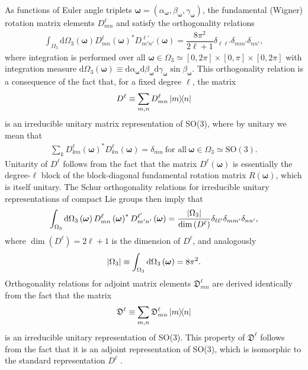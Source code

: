 \documentclass[notitlepage,twocolumn]{revtex4-2}
\renewcommand{\t}{\text} %
\newcommand{\f}[2]{\dfrac{#1}{#2}} %
\newcommand{\p}[1]{\left(#1\right)} %
\renewcommand{\v}{\bm} %
\newcommand{\1}{\mathds{1}}
\newcommand{\D}{\mathfrak{D}}
\renewcommand{\d}{\text{d}}
\newcommand{\SO}{\text{SO}}
\begin{document}
As functions of Euler angle triplets $\v\omega=\p{\alpha_{\v\omega},\beta_{\v\omega},\gamma_{\v\omega}}$, the fundamental (Wigner) rotation matrix elements $D_{mn}^\ell$ and satisfy the orthogonality relations \cite{brown2003rotational}
\begin{align}
  \int_{\Omega_3} \d\Omega_3\p{\v\omega}
  D^{\ell}_{mn}\p{\v\omega}^* D^{\ell'}_{m'n'}\p{\v\omega}
  = \f{8\pi^2}{2\ell+1} \delta_{\ell\ell'} \delta_{mm'} \delta_{nn'},
  \label{eq:orthogonal}
\end{align}
where integration is performed over all $\v\omega\in\Omega_3\simeq[0,2\pi]\times[0,\pi]\times[0,2\pi]$ with integration measure $\d\Omega_3\p{\v\omega}\equiv\d\alpha_{\v\omega} \d\beta_{\v\omega} \d\gamma_{\v\omega} \sin\beta_{\v\omega}$.
This orthogonality relation is a consequence of the fact that, for a fixed degree $\ell$, the matrix
\begin{align}
  D^\ell \equiv \sum_{m,n} D^\ell_{mn} \op{m}{n}
\end{align}
is an irreducible unitary matrix representation of SO(3), where by unitary we mean that
\begin{align}
  \sum_k D^\ell_{km}\p{\v\omega}^* D^\ell_{kn}\p{\v\omega} = \delta_{mn}
  ~\t{for all}~\v\omega\in\Omega_3\simeq\SO(3).
\end{align}
Unitarity of $D^\ell$ follows from the fact that the matrix $D^\ell\p{\v\omega}$ is essentially the degree-$\ell$ block of the block-diagonal fundamental rotation matrix $R\p{\v\omega}$, which is itself unitary.
The Schur orthogonality relations for irreducible unitary representations of compact Lie groups then imply that \cite{cornwell1997group}
\begin{align}
  \int_{\Omega_3} \d\Omega_3\p{\v\omega}
  D^{\ell}_{mn}\p{\v\omega}^* D^{\ell'}_{m'n'}\p{\v\omega}
  = \f{\abs{\Omega_3}}{\dim\p{D^\ell}}
  \delta_{\ell\ell'} \delta_{mm'} \delta_{nn'},
  \label{eq:ortho_full_apndx}
\end{align}
where $\dim\p{D^\ell}=2\ell+1$ is the dimension of $D^\ell$, and analogously
\begin{align}
  \abs{\Omega_3} \equiv \int_{\Omega_3} \d\Omega_3\p{\v\omega} = 8\pi^2.
\end{align}
Orthogonality relations for adjoint matrix elements $\D^\ell_{mn}$ are derived identically from the fact that the matrix
\begin{align}
  \D^\ell \equiv \sum_{m,n} \D^\ell_{mn} \op{m}{n}
\end{align}
is an irreducible unitary representation of SO(3).
This property of $\D^\ell$ follows from the fact that it is an adjoint representation of SO(3), which is isomorphic to the standard representation $D^\ell$ \cite{hall2015lie}.
\end{document}
